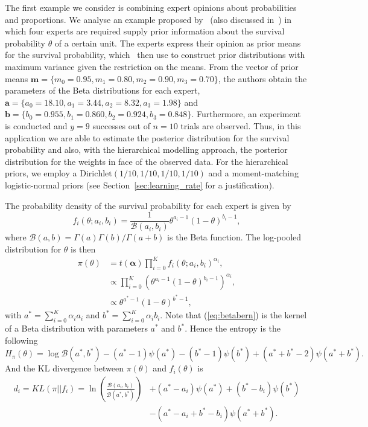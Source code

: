 \documentclass[a4paper, notitlepage, 10pt]{article}
\begin{document}
The first example we consider is combining expert opinions about probabilities and proportions.
We analyse an example proposed by~\cite{savchuk1994} (also discussed in~\cite{rufo2012B}) in which four experts are required supply prior information about the survival probability $\theta$ of a certain unit.
The experts express their opinion as prior means for the survival probability, which~\cite{savchuk1994} then use to construct prior distributions with maximum variance given the restriction on the means.
From the vector of prior means $\mathbf{m} = \{ m_0 = 0.95, m_1 = 0.80, m_2 = 0.90, m_3 = 0.70 \}$, the authors obtain the parameters of the Beta distributions for each expert,  $\mathbf{a} = \{ a_0 = 18.10, a_1 = 3.44 , a_2 = 8.32, a_3 = 1.98 \}$ and  $\mathbf{b} = \{ b_0 = 0.955 , b_1 = 0.860, b_2 = 0.924, b_3 = 0.848\}$.
Furthermore, an experiment is conducted and $y = 9$ successes out of $n = 10$ trials are observed.
Thus, in this application we are able to estimate the posterior distribution for the survival probability and also, with  the hierarchical modelling approach, the posterior distribution for the weights in face of the observed data.
For the hierarchical priors, we employ a $\text{Dirichlet}(1/10, 1/10, 1/10, 1/10)$ and a moment-matching logistic-normal priors (see Section~\ref{sec:learning_rate} for a justification).

The probability density of the survival probability for each expert is given by
$$f_i(\theta;a_i, b_i) = \frac{1}{\mathcal{B}(a_i, b_i)} \theta^{a_i-1}(1-\theta)^{b_i-1},$$
where $\mathcal{B}(a,b)= \Gamma(a)\Gamma(b)/\Gamma(a + b)$ is the Beta function.
The log-pooled distribution for $\theta$ is then
\begin{align}
\nonumber
\pi(\theta) & = t(\boldsymbol\alpha)\prod_{i=0}^{K}f_i(\theta;a_i,b_i)^{\alpha_i},\\
\nonumber
            & \propto \prod_{i=0}^{K} \left(\theta^{a_i-1}(1-\theta)^{b_i-1} \right)^{\alpha_i},\\
\label{eq:betabern}
&\propto \theta^{a^*-1}(1-\theta)^{b^*-1},
\end{align}
with $a^* =\sum_{i=0}^{K}\alpha_ia_i$ and $b^* = \sum_{i=0}^{K}\alpha_ib_i$.
Note that (\ref{eq:betabern}) is the kernel of a Beta distribution with parameters $a^*$ and $b^*$. Hence the entropy is the following
\begin{equation}
 \label{eq:entropybeta}
 H_{\pi}(\theta) = \log \mathcal{B}(a^*,b^*) - (a^*-1)\psi(a^*) - (b^*-1)\psi(b^*) + (a^*+b^* -2)\psi(a^*+b^*).
\end{equation}
And the KL divergence between $\pi(\theta)$ and $f_i(\theta)$  is
\begin{equation}
\begin{split}
 \label{eq:KLbeta}
 d_i = KL(\pi || f_i) = \ln\left(\frac{\mathcal{B}(a_i, b_i)}{\mathcal{B}(a^*, 
b^*)}\right) & + (a^* - a_i) \psi(a^*)+ (b^* - b_i)\psi(b^*) \\
 &- (a^*-a_i + b^* - b_i)\psi(a^*+b^*).
\end{split}
\end{equation}
\end{document}
